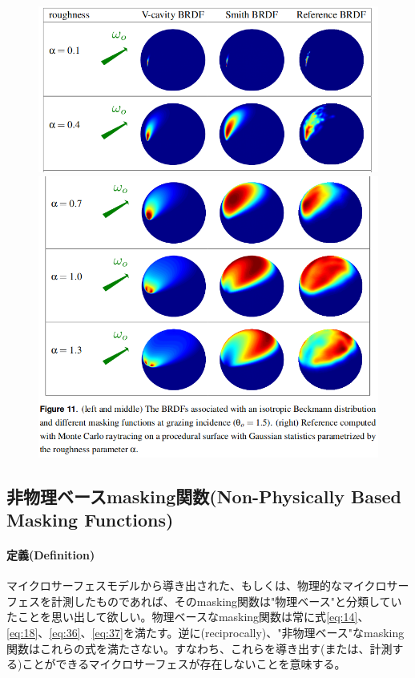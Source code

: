 \documentclass[a4j,xelatex,ja=standard]{bxjsarticle}
\begin{document}
\begin{figure}
    \includegraphics[width=\textwidth]{Figure11_1.png}
    \includegraphics[width=\textwidth]{Figure11_2.png}
    \caption{}
    \label{fig:11}
\end{figure}

\subsection{非物理ベースmasking関数(Non-Physically Based Masking Functions)}

\paragraph{定義(Definition)}

マイクロサーフェスモデルから導き出された、もしくは、物理的なマイクロサーフェスを計測したものであれば、そのmasking関数は"物理ベース"と分類していたことを思い出して欲しい。物理ベースなmasking関数は常に式\eqref{eq:14}、\eqref{eq:18}、\eqref{eq:36}、\eqref{eq:37}を満たす。逆に(reciprocally)、"非物理ベース"なmasking関数はこれらの式を満たさない。すなわち、これらを導き出す(または、計測する)ことができるマイクロサーフェスが存在しないことを意味する。
\end{document}
